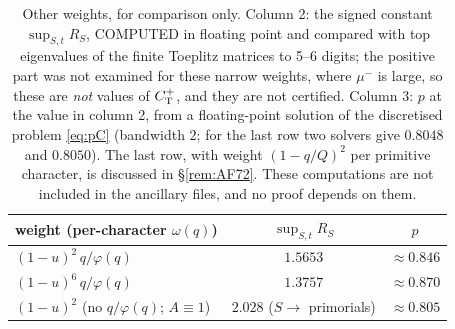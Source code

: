 \begin{table}[ht]
\centering\small
\begin{tabular}{lcc}
\hline
weight (per-character $\omega(q)$) & $\sup_{S,t}R_S$ & $p$\\
\hline
$(1-u)^2\,q/\varphi(q)$ & $1.5653$ & $\approx0.846$\\
$(1-u)^6\,q/\varphi(q)$ & $1.3757$ & $\approx0.870$\\
$(1-u)^2$ (no $q/\varphi(q)$; $A\equiv1$) & $2.028$ ($S\to$ primorials) & $\approx0.805$\\
\hline
\end{tabular}
\caption{Other weights, for comparison only. Column 2: the signed constant $\sup_{S,t}R_S$, COMPUTED in floating point and
compared with top eigenvalues of the finite Toeplitz matrices to 5--6 digits; the positive part was not examined for these narrow
weights, where $\mu^-$ is large, so these are \emph{not} values of $C^{+}_{\mathrm T}$, and they are not certified. Column 3: $p$ at the value in
column 2, from a floating-point solution of the discretised problem \eqref{eq:pC} (bandwidth $2$; for the last row two solvers
give $0.8048$ and $0.8050$). The last row, with weight $(1-q/Q)^2$ per primitive character, is discussed in \S\ref{rem:AF72}. These
computations are not included in the ancillary files, and no proof depends on them.}
\label{tab:otherw}
\end{table}
